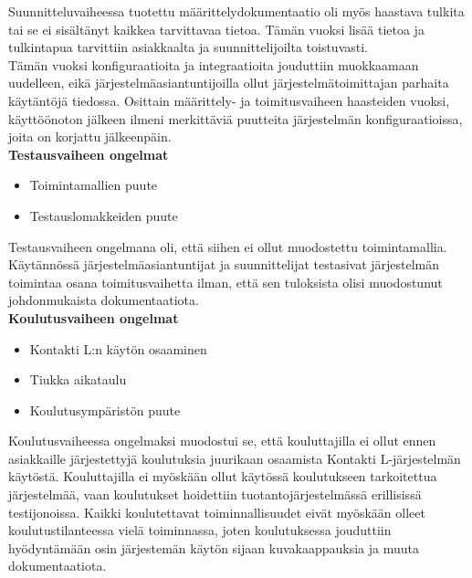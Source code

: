 \documentclass[finnish,12pt,a4paper,pdftex]{article}
\begin{document}
Suunnitteluvaiheessa tuotettu määrittelydokumentaatio oli myös haastava tulkita tai se ei sisältänyt kaikkea tarvittavaa tietoa. Tämän vuoksi lisää tietoa ja tulkintapua tarvittiin asiakkaalta ja suunnittelijoilta toistuvasti.\\

Tämän vuoksi konfiguraatioita ja integraatioita jouduttiin muokkaamaan uudelleen, eikä järjestelmäasiantuntijoilla ollut järjestelmätoimittajan parhaita käytäntöjä tiedossa. Osittain määrittely- ja toimitusvaiheen haasteiden vuoksi, käyttöönoton jälkeen ilmeni merkittäviä puutteita järjestelmän konfiguraatioissa, joita on korjattu jälkeenpäin.\\

\textbf{Testausvaiheen ongelmat}\\

\begin{itemize}
    \item Toimintamallien puute
    \item Testauslomakkeiden puute
\end{itemize}

Testausvaiheen ongelmana oli, että siihen ei ollut muodostettu toimintamallia. Käytännössä järjestelmäasiantuntijat ja suunnittelijat testasivat järjestelmän toimintaa osana toimitusvaihetta ilman, että sen tuloksista olisi muodostunut johdonmukaista dokumentaatiota. \\

\textbf{Koulutusvaiheen ongelmat}\\

\begin{itemize}
    \item Kontakti L:n käytön osaaminen
    \item Tiukka aikataulu
    \item Koulutusympäristön puute
\end{itemize}

Koulutusvaiheessa ongelmaksi muodostui se, että kouluttajilla ei ollut ennen asiakkaille järjestettyjä koulutuksia juurikaan osaamista Kontakti L-järjestelmän käytöstä. Kouluttajilla ei myöskään ollut käytössä koulutukseen tarkoitettua järjestelmää, vaan koulutukset hoidettiin tuotantojärjestelmässä erillisissä testijonoissa. Kaikki koulutettavat toiminnallisuudet eivät myöskään olleet koulutustilanteessa vielä toiminnassa, joten koulutuksessa jouduttiin hyödyntämään osin järjestemän käytön sijaan kuvakaappauksia ja muuta dokumentaatiota.\\
\end{document}
